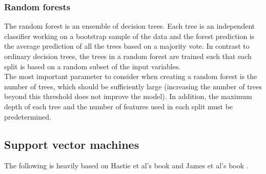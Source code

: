 \documentclass[notitlepage, reprint, nofootinbib]{revtex4-1}
\begin{document}
\subsubsection{Random forests}
The random forest is an ensemble of decision trees. Each tree is an independent classifier working on a bootstrap sample of the data and the forest prediction is the average prediction of all the trees based on a majority vote. \cite{lecturenotes3} In contrast to ordinary decision trees, the trees in a random forest are trained such that each split is based on a random subset of the input variables. \cite{ESL} \\[2mm]
The most important parameter to consider when creating a random forest is the number of trees, which should be sufficiently large (increasing the number of trees beyond this threshold does not improve the model). In addition, the maximum depth of each tree and the number of features used in each split must be predetermined. 


\subsection{Support vector machines}
The following is heavily based on Hastie et al's book \cite{ESL} and James et al's book \cite{ISL}. 
\end{document}
